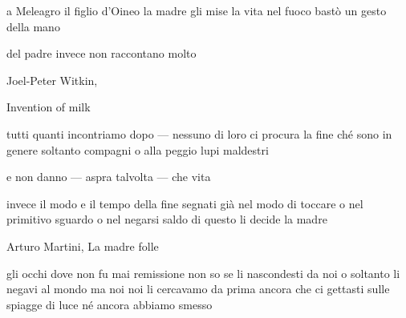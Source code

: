\begin{volumetitlepage}
\end{volumetitlepage}


\begin{poem}
	\begin{stanza}
		a Meleagro\verseline
		il figlio d'Oineo\verseline
		la madre gli mise la vita nel fuoco\verseline
		bastò un gesto della mano
	\end{stanza}

	\begin{stanza}
		del padre invece non raccontano molto
	\end{stanza}
\end{poem}

\clearpage


\begin{artItem}
	Joel-Peter Witkin, \begin{otherlanguage}{english}%
		Invention of milk%
	\end{otherlanguage}
\end{artItem}

\begin{poem}
	\begin{stanza}
		tutti quanti incontriamo dopo —\verseline
		nessuno di loro ci procura la fine\verseline
		ché sono in genere soltanto compagni\verseline
		o alla peggio lupi maldestri
	\end{stanza}

	\begin{stanza}
		e non danno\verseline
		— aspra talvolta —\verseline
		che vita
	\end{stanza}

	\begin{stanza}
		invece il modo e il tempo della fine\verseline
		segnati già nel modo di toccare\verseline
		o nel primitivo sguardo\verseline
		o nel negarsi saldo di questo\verseline
		li decide la madre
	\end{stanza}
\end{poem}

\clearpage


\begin{artItem}
	Arturo Martini, La madre folle
\end{artItem}

\begin{poem}
	\begin{stanza}
		gli occhi dove non fu mai remissione\verseline
		non so se li nascondesti da noi\verseline
		o soltanto li negavi al mondo\verseline
		ma noi noi li cercavamo da prima ancora\verseline
		che ci gettasti sulle spiagge di luce\verseline
		né ancora abbiamo smesso
	\end{stanza}
\end{poem}

